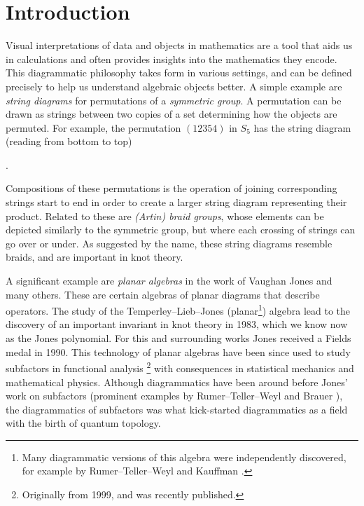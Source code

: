 \chapter{Introduction}

Visual interpretations of data and objects in mathematics are a tool that aids us in calculations and often provides insights into the mathematics they encode. This diagrammatic philosophy takes form in various settings, and can be defined precisely to help us understand algebraic objects better. A simple example are \textit{string diagrams} for permutations of a \textit{symmetric group}. A permutation can be drawn as strings between two copies of a set determining how the objects are permuted. For example, the permutation $(12354)$ in $S_5$ has the string diagram (reading from bottom to top)
\begin{center}
    .
\end{center}
Compositions of these permutations is the operation of joining corresponding strings start to end in order to create a larger string diagram representing their product. Related to these are \textit{(Artin) braid groups}, whose elements can be depicted similarly to the symmetric group, but where each crossing of strings can go over or under. As suggested by the name, these string diagrams resemble braids, and are important in knot theory.

A significant example are \textit{planar algebras} in the work of Vaughan Jones and many others. These are certain algebras of planar diagrams that describe operators. The study of the Temperley--Lieb--Jones (planar\footnote{Many diagrammatic versions of this algebra were independently discovered, for example by Rumer--Teller--Weyl \cite{weyl-diagrammatics} and Kauffman \cite{kauffman-tl-planar-algebra}.}) algebra lead to the discovery of an important invariant in knot theory \cite{jones-knot-polynomial} in 1983, which we know now as the Jones polynomial. For this and surrounding works Jones received a Fields medal in 1990. This technology of planar algebras have been since used to study subfactors in functional analysis \cite{jones-planar-algebra}\footnote{Originally from 1999, and was recently published.} with consequences in statistical mechanics and mathematical physics. Although diagrammatics have been around before Jones' work on subfactors (prominent examples by Rumer--Teller--Weyl \cite{weyl-diagrammatics} and Brauer \cite{brauer-diagrammatics}), the diagrammatics of subfactors was what kick-started diagrammatics as a field with the birth of quantum topology.

